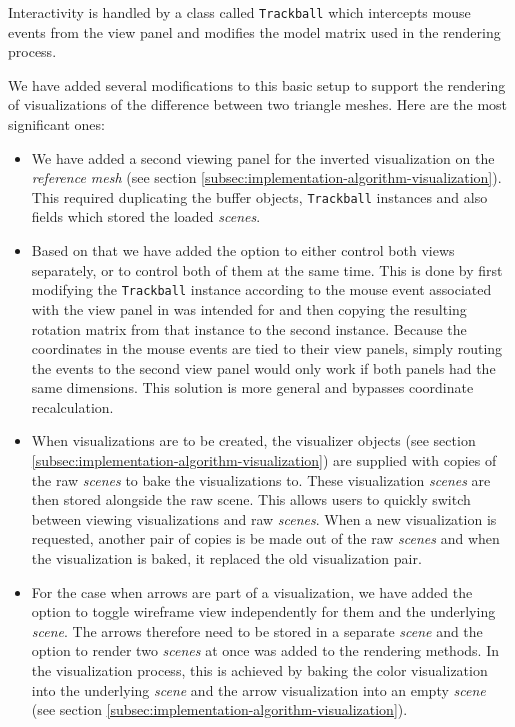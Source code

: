 Interactivity is handled by a class called \verb+Trackball+ which intercepts mouse events from the view panel and modifies the model matrix used in the rendering process.

We have added several modifications to this basic setup to support the rendering of visualizations of the difference between two triangle meshes. Here are the most significant ones:

\begin{itemize}
\item We have added a second viewing panel for the inverted visualization on the {\it reference mesh} (see section \ref{subsec:implementation-algorithm-visualization}). This required duplicating the buffer objects, \verb+Trackball+ instances and also fields which stored the loaded {\it scenes}.
\item Based on that we have added the option to either control both views separately, or to control both of them at the same time. This is done by first modifying the \verb+Trackball+ instance according to the mouse event associated with the view panel in was intended for and then copying the resulting rotation matrix from that instance to the second instance. Because the coordinates in the mouse events are tied to their view panels, simply routing the events to the second view panel would only work if both panels had the same dimensions. This solution is more general and bypasses coordinate recalculation.
\item When visualizations are to be created, the visualizer objects (see section \ref{subsec:implementation-algorithm-visualization}) are supplied with copies of the raw {\it scenes} to bake the visualizations to. These visualization {\it scenes} are then stored alongside the raw scene. This allows users to quickly switch between viewing visualizations and raw {\it scenes}. When a new visualization is requested, another pair of copies is be made out of the raw {\it scenes} and when the visualization is baked, it replaced the old visualization pair.
\item For the case when arrows are part of a visualization, we have added the option to toggle wireframe view independently for them and the underlying {\it scene}. The arrows therefore need to be stored in a separate {\it scene} and the option to render two {\it scenes} at once was added to the rendering methods. In the visualization process, this is achieved by baking the color visualization into the underlying {\it scene} and the arrow visualization into an empty {\it scene} (see section \ref{subsec:implementation-algorithm-visualization}).
\end{itemize}

